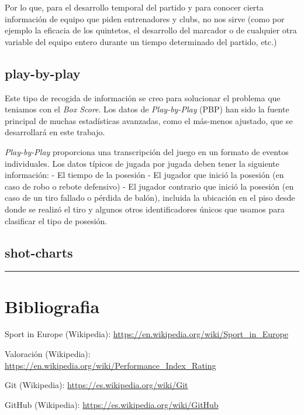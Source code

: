 \documentclass[
]{article}
\begin{document}
Por lo que, para el desarrollo temporal del partido y para conocer
cierta información de equipo que piden entrenadores y clubs, no nos
sirve (como por ejemplo la eficacia de los quintetos, el desarrollo del
marcador o de cualquier otra variable del equipo entero durante un
tiempo determinado del partido, etc.)

\hypertarget{play-by-play}{%
\subsection{play-by-play}\label{play-by-play}}

Este tipo de recogida de información se creo para solucionar el problema
que teniamos con el \emph{Box Score}. Los datos de \emph{Play-by-Play}
(PBP) han sido la fuente principal de muchas estadísticas avanzadas,
como el más-menos ajustado, que se desarrollará en este trabajo.

\emph{Play-by-Play} proporciona una transcripción del juego en un
formato de eventos individuales. Los datos típicos de jugada por jugada
deben tener la siguiente información: - El tiempo de la posesión - El
jugador que inició la posesión (en caso de robo o rebote defensivo) - El
jugador contrario que inició la posesión (en caso de un tiro fallado o
pérdida de balón), incluida la ubicación en el piso desde donde se
realizó el tiro y algunos otros identificadores únicos que usamos para
clasificar el tipo de posesión.

\hypertarget{shot-charts}{%
\subsection{shot-charts}\label{shot-charts}}

\begin{center}\rule{0.5\linewidth}{0.5pt}\end{center}

\hypertarget{bibliografia}{%
\section{Bibliografia}\label{bibliografia}}

Sport in Europe (Wikipedia):
\url{https://en.wikipedia.org/wiki/Sport_in_Europe}

Valoración (Wikipedia):
\url{https://en.wikipedia.org/wiki/Performance_Index_Rating}

Git (Wikipedia): \url{https://es.wikipedia.org/wiki/Git}

GitHub (Wikipedia): \url{https://es.wikipedia.org/wiki/GitHub}
\end{document}
